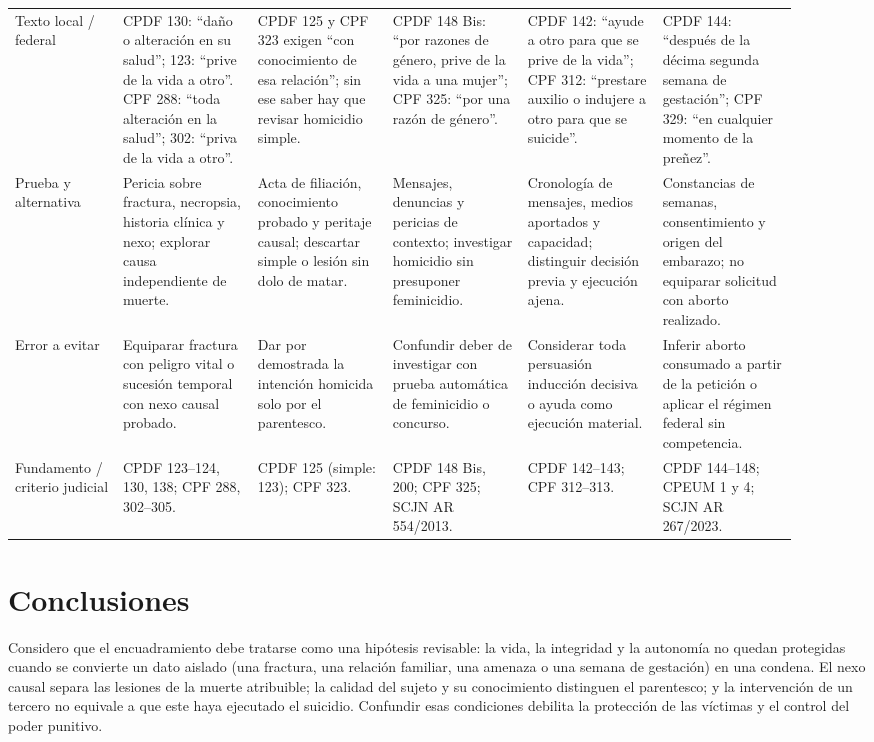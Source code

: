 \documentclass[spanish,letterpaper,oneside]{article}
\begin{document}
\begin{landscape}
\begin{longtable}{@{}>{\raggedright\arraybackslash}p{0.12\linewidth}*{5}{>{\raggedright\arraybackslash}p{0.158\linewidth}}@{}}
Texto local / federal & CPDF 130: ``daño o alteración en su salud''; 123: ``prive de la vida a otro''. CPF 288: ``toda alteración en la salud''; 302: ``priva de la vida a otro''. & CPDF 125 y CPF 323 exigen ``con conocimiento de esa relación''; sin ese saber hay que revisar homicidio simple. & CPDF 148 Bis: ``por razones de género, prive de la vida a una mujer''; CPF 325: ``por una razón de género''. & CPDF 142: ``ayude a otro para que se prive de la vida''; CPF 312: ``prestare auxilio o indujere a otro para que se suicide''. & CPDF 144: ``después de la décima segunda semana de gestación''; CPF 329: ``en cualquier momento de la preñez''. \\
Prueba y alternativa & Pericia sobre fractura, necropsia, historia clínica y nexo; explorar causa independiente de muerte. & Acta de filiación, conocimiento probado y peritaje causal; descartar simple o lesión sin dolo de matar. & Mensajes, denuncias y pericias de contexto; investigar homicidio sin presuponer feminicidio. & Cronología de mensajes, medios aportados y capacidad; distinguir decisión previa y ejecución ajena. & Constancias de semanas, consentimiento y origen del embarazo; no equiparar solicitud con aborto realizado. \\
Error a evitar & Equiparar fractura con peligro vital o sucesión temporal con nexo causal probado. & Dar por demostrada la intención homicida solo por el parentesco. & Confundir deber de investigar con prueba automática de feminicidio o concurso. & Considerar toda persuasión inducción decisiva o ayuda como ejecución material. & Inferir aborto consumado a partir de la petición o aplicar el régimen federal sin competencia. \\
Fundamento / criterio judicial & CPDF 123--124, 130, 138; CPF 288, 302--305. & CPDF 125 (simple: 123); CPF 323. & CPDF 148 Bis, 200; CPF 325; SCJN AR 554/2013. & CPDF 142--143; CPF 312--313. & CPDF 144--148; CPEUM 1 y 4; SCJN AR 267/2023. \\
\bottomrule
\end{longtable}
\endgroup
\end{landscape}
\clearpage
\section{Conclusiones}
Considero que el encuadramiento debe tratarse como una hipótesis revisable: la vida, la integridad y la autonomía no quedan protegidas cuando se convierte un dato aislado (una fractura, una relación familiar, una amenaza o una semana de gestación) en una condena. El nexo causal separa las lesiones de la muerte atribuible; la calidad del sujeto y su conocimiento distinguen el parentesco; y la intervención de un tercero no equivale a que este haya ejecutado el suicidio. Confundir esas condiciones debilita la protección de las víctimas y el control del poder punitivo.
\end{document}
